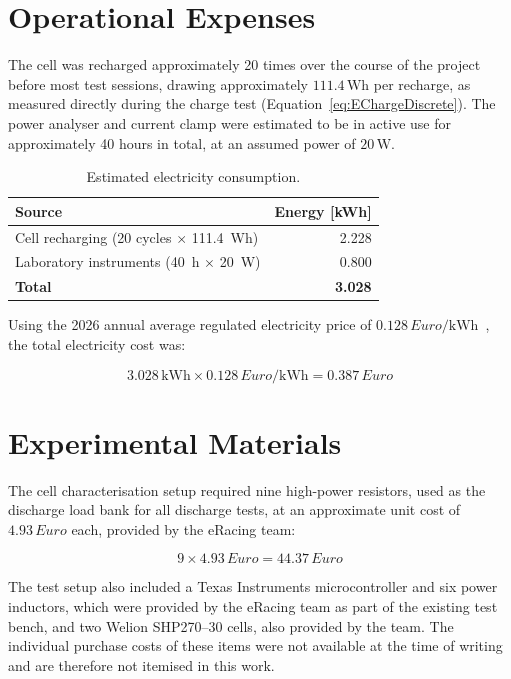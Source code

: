 \section{Operational Expenses}

The cell was recharged approximately 20 times over the course of the project 
before most test sessions, drawing 
approximately $111.4\,\text{Wh}$ per recharge, as measured directly during the 
charge test (Equation~\ref{eq:EChargeDiscrete}). The power analyser and current 
clamp were estimated to be in active use for approximately 40 hours in total, at 
an assumed power of $20\,\text{W}$.

\begin{table}[H]
    \centering
    \begin{tabular}{lr}
        \toprule
        \textbf{Source} & \textbf{Energy [kWh]} \\
        \midrule
        Cell recharging (20 cycles $\times$ 111.4~Wh) & 2.228 \\
        Laboratory instruments (40~h $\times$ 20~W)   & 0.800 \\
        \midrule
        \textbf{Total} & \textbf{3.028} \\
        \bottomrule
    \end{tabular}
    \caption{Estimated electricity consumption.}
    \label{tab:Electricity}
\end{table}

Using the 2026 annual average regulated electricity price of 
$0.128\,Euro/\text{kWh}$~\cite{PVPC2026}, the total electricity cost was:

\begin{equation}
    3.028\,\text{kWh} \times 0.128\,Euro/\text{kWh} = 0.387\,Euro
\end{equation}

\section{Experimental Materials}

The cell characterisation setup required nine high-power resistors, used as the 
discharge load bank for all discharge tests, at an approximate 
unit cost of $4.93\,Euro$ each, provided by the eRacing team:

\begin{equation}
    9 \times 4.93\,Euro = 44.37\,Euro
\end{equation}

The test setup also included a Texas Instruments microcontroller and six power 
inductors, which were provided by the eRacing team as part of the existing test bench, 
and two Welion SHP270--30 cells, also provided by the team. The individual purchase 
costs of these items were not available at the time of writing and are therefore 
not itemised in this work.

